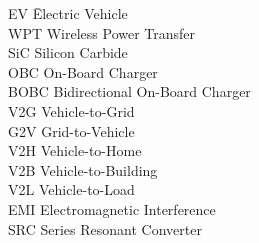 \documentclass[12pt,a4paper]{report}
\begin{document}
\hspace{-2cm}

\begin{tabbing}

   

 



\hspace{1.5cm}\par EV \hspace{3.5cm}\=Electric Vehicle\\
\hspace{1.5cm}WPT\> Wireless Power Transfer\\


\hspace{1.5cm}SiC \> Silicon Carbide\\

 

\hspace{1.5cm}OBC \> On-Board Charger\\

 

\hspace{1.5cm}BOBC \> Bidirectional On-Board Charger\\

 

\hspace{1.5cm}V2G \> Vehicle-to-Grid\\

 

\hspace{1.5cm}G2V \> Grid-to-Vehicle\\

 

\hspace{1.5cm}V2H \> Vehicle-to-Home\\

 

\hspace{1.5cm}V2B \> Vehicle-to-Building\\

 

\hspace{1.5cm}V2L \> Vehicle-to-Load\\

 

\hspace{1.5cm}EMI \>Electromagnetic Interference\\

 

\hspace{1.5cm}SRC\> Series Resonant Converter\\


\end{tabbing}
\end{document}
